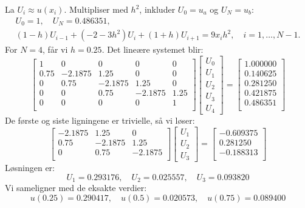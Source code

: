 La \(U_i \approx u(x_i)\). Multipliser med \(h^2\), inkluder \(U_0 = u_a\) og \(U_N = u_b\):
\begin{align*}
U_0 = 1, \quad U_N = 0.486351, \\  (1 - h)U_{i-1} + (-2 - 3h^2)U_i + (1 + h)U_{i+1} = 9x_i h^2, \quad i = 1, \dots, N-1.
\end{align*}
For \(N = 4\), får vi \(h = 0.25\). Det lineære systemet blir:
\[
\begin{bmatrix}
1 & 0 & 0 & 0 & 0 \\
0.75 & -2.1875 & 1.25 & 0 & 0 \\
0 & 0.75 & -2.1875 & 1.25 & 0 \\
0 & 0 & 0.75 & -2.1875 & 1.25 \\
0 & 0 & 0 & 0 & 1 \\
\end{bmatrix}
\begin{bmatrix}
U_0 \\ U_1 \\ U_2 \\ U_3 \\ U_4
\end{bmatrix}
=
\begin{bmatrix}
1.000000 \\
0.140625 \\
0.281250 \\
0.421875 \\
0.486351 \\
\end{bmatrix}
\]
De første og siste ligningene er trivielle, så vi løser:
\[
\begin{bmatrix}
-2.1875 & 1.25 & 0 \\
0.75 & -2.1875 & 1.25 \\
0 & 0.75 & -2.1875 \\
\end{bmatrix}
\begin{bmatrix}
U_1 \\ U_2 \\ U_3
\end{bmatrix}
=
\begin{bmatrix}
-0.609375 \\
0.281250 \\
-0.188313 \\
\end{bmatrix}
\]
Løsningen er:
\[
U_1 = 0.293176, \quad U_2 = 0.025557, \quad U_3 = 0.093820
\]
Vi sameligner med de eksakte verdier:
\[
u(0.25) = 0.290417, \quad u(0.5) = 0.020573, \quad u(0.75) = 0.089400
\]


